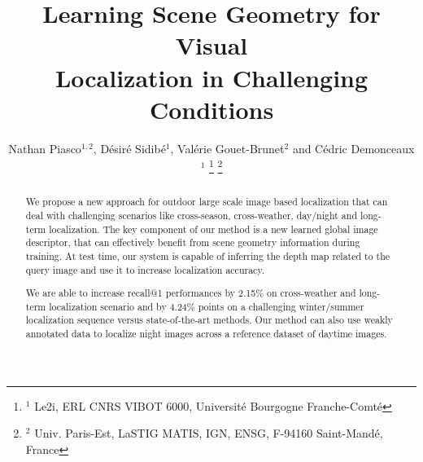 \documentclass[letterpaper, 10 pt, conference]{ieeeconf}  %
\title{\LARGE \bf
Learning Scene Geometry for Visual\\Localization in Challenging Conditions
}
\author{Nathan Piasco${}^{1,2}$, D\'esir\'e Sidib\'e${}^1$, Val\'erie Gouet-Brunet${}^2$ and C\'edric Demonceaux${}^1$%
\thanks{${}^1$ Le2i, ERL CNRS VIBOT 6000,  Universit\'e  Bourgogne Franche-Comt\'e}%
\thanks{${}^2$ Univ. Paris-Est, LaSTIG MATIS, IGN, ENSG, F-94160 Saint-Mand\'e, France}%
}
\begin{document}
\newcommand{\norm}[1]{\left\lVert#1\right\rVert}
\newcommand\numberthis{\addtocounter{equation}{1}\tag{\theequation}}

\maketitle
\thispagestyle{empty}
\pagestyle{empty}


\begin{abstract}
We propose a new approach for outdoor large scale image based localization that can deal with challenging scenarios like cross-season, cross-weather, day/night and long-term localization. The key component of our method is a new learned global image descriptor, that can effectively benefit from scene geometry information during training. At test time, our system is capable of inferring the depth map related to the query image and use it to increase localization accuracy.

We are able to increase recall@1 performances by 2.15\% on cross-weather and long-term localization scenario and by 4.24\% points on a challenging winter/summer localization sequence versus state-of-the-art methods. Our method can also use weakly annotated data to localize night images across a reference dataset of daytime images.
\end{abstract}










\end{document}
